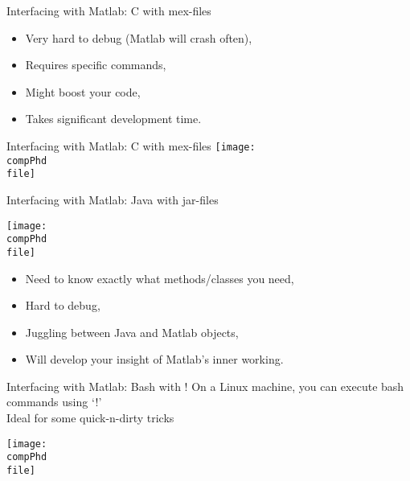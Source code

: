 \documentclass[]{beamer} %
\def\pathbase{/Users/pmxal9/} 	%
\def\pathbase{/Users/pmaal/} 	%
\edef\drop{\pathbase Dropbox/}		%
\edef\compPhd{\drop Nottingham/repos/phd/Seminars/+MatlabComputationalPhD/}
\begin{document}
\begin{frame}{Interfacing with Matlab: C with mex-files}
\begin{itemize}
\item Very hard to debug (Matlab will crash often),
\item Requires specific commands, 
\item Might boost your code,
\item Takes significant development time.
\end{itemize}
\end{frame}


\begin{frame}{Interfacing with Matlab: C with mex-files}
\def\file{interfacing/C_mex}
\noindent\hspace{-7mm}\texttt{[image: \\compPhd \\file]}
\end{frame}


\begin{frame}{Interfacing with Matlab: Java with jar-files}
\begin{minipage}{6cm}
\def\file{interfacing/java}
\begin{center}\texttt{[image: \\compPhd \\file]}\end{center}
\end{minipage}%
\begin{minipage}{6cm}
\begin{itemize}
\item Need to know exactly what methods/classes you need,
\item Hard to debug, 
\item Juggling between Java and Matlab objects,
\item Will develop your insight of Matlab's inner working.
\end{itemize}
\end{minipage}
\end{frame}


\begin{frame}{Interfacing with Matlab: Bash with !}
On a Linux machine, you can execute bash commands using `!'\\
Ideal for some quick-n-dirty tricks
\def\file{interfacing/bash}
\begin{center}\texttt{[image: \\compPhd \\file]}\end{center}
\end{frame}
\end{document}
